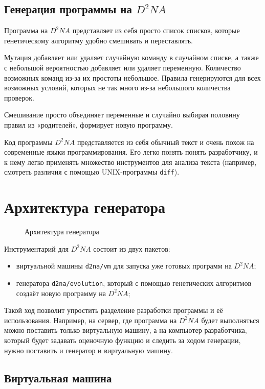 \documentclass[utf8,a5paper,portrait,10pt,twoside]{eskdtext}
\begin{document}
\newpage
\subsection{Генерация программы на $D^2NA$}
Программа на $D^2NA$ представляет из себя просто список списков, которые
генетическому алгоритму удобно смешивать и переставлять.

Мутация добавляет или удаляет случайную команду в случайном списке, а также с
небольшой вероятностью добавляет или удаляет переменную. Количество возможных
команд из-за их простоты небольшое. Правила генерируются для всех возможных
условий, которых не так много из-за небольшого количества проверок.

Смешивание просто объединяет переменные и случайно выбирая половину правил из
«родителей», формирует новую программу.

Код программы $D^2NA$ представляется из себя обычный текст и очень похож на
современные языки программирования. Его легко понять понять разработчику,
и к нему легко применять множество инструментов для анализа текста (например,
смотреть различия с помощью UNIX-программы \texttt{diff}).

\newpage
\section{Архитектура генератора}

\begin{figure}
  \centering
  
  \caption{Архитектура генератора}
\end{figure}

Инструментарий для $D^2NA$ состоит из двух пакетов:
\begin{itemize}
  \item виртуальной машины \texttt{d2na/vm} для запуска уже готовых программ на
        $D^2NA$;
  \item генератора \texttt{d2na/evolution}, который с помощью генетических
        алгоритмов создаёт новую программу на $D^2NA$;
\end{itemize}

Такой ход позволит упростить разделение разработки программы и её использования.
Например, на сервер, где программа на $D^2NA$ будет выполняться можно поставить
только виртуальную машину, а на компьютер разработчика, который будет задавать
оценочную функцию и следить за ходом генерации, нужно поставить и генератор и
виртуальную машину.

\newpage
\subsection{Виртуальная машина}
\end{document}
